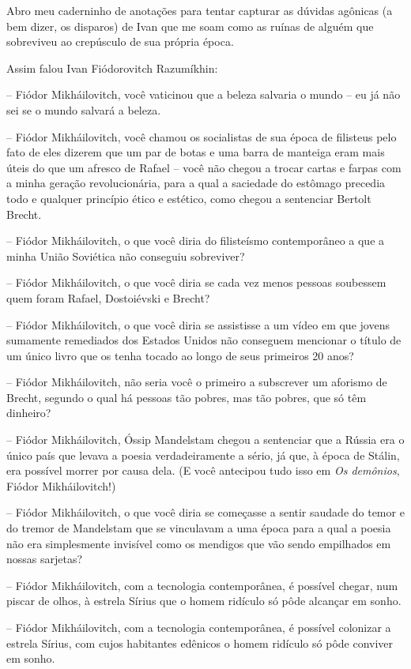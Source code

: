 Abro meu caderninho de anotações para tentar capturar as dúvidas
agônicas (a bem dizer, os disparos) de Ivan que me soam como as ruínas
de alguém que sobreviveu ao crepúsculo de sua própria época.

Assim falou Ivan Fiódorovitch Razumíkhin:

-- Fiódor Mikháilovitch, você vaticinou que a beleza salvaria o mundo --
eu já não sei se o mundo salvará a beleza.

-- Fiódor Mikháilovitch, você chamou os socialistas de sua época de
filisteus pelo fato de eles dizerem que um par de botas e uma barra de
manteiga eram mais úteis do que um afresco de Rafael -- você não chegou
a trocar cartas e farpas com a minha geração revolucionária, para a qual
a saciedade do estômago precedia todo e qualquer princípio ético e
estético, como chegou a sentenciar Bertolt Brecht.

-- Fiódor Mikháilovitch, o que você diria do filisteísmo contemporâneo a
que a minha União Soviética não conseguiu sobreviver?

-- Fiódor Mikháilovitch, o que você diria se cada vez menos pessoas
soubessem quem foram Rafael, Dostoiévski e Brecht?

-- Fiódor Mikháilovitch, o que você diria se assistisse a um vídeo em
que jovens sumamente remediados dos Estados Unidos não conseguem
mencionar o título de um único livro que os tenha tocado ao longo de
seus primeiros 20 anos?

-- Fiódor Mikháilovitch, não seria você o primeiro a subscrever um
aforismo de Brecht, segundo o qual há pessoas tão pobres, mas tão
pobres, que só têm dinheiro?

-- Fiódor Mikháilovitch, Óssip Mandelstam chegou a sentenciar que a
Rússia era o único país que levava a poesia verdadeiramente a sério, já
que, à época de Stálin, era possível morrer por causa dela. (E você
antecipou tudo isso em \emph{Os demônios}, Fiódor Mikháilovitch!)

-- Fiódor Mikháilovitch, o que você diria se começasse a sentir saudade
do temor e do tremor de Mandelstam que se vinculavam a uma época para a
qual a poesia não era simplesmente invisível como os mendigos que vão
sendo empilhados em nossas sarjetas?

-- Fiódor Mikháilovitch, com a tecnologia contemporânea, é possível
chegar, num piscar de olhos, à estrela Sírius que o homem ridículo só
pôde alcançar em sonho.

-- Fiódor Mikháilovitch, com a tecnologia contemporânea, é possível
colonizar a estrela Sírius, com cujos habitantes edênicos o homem
ridículo só pôde conviver em sonho.

